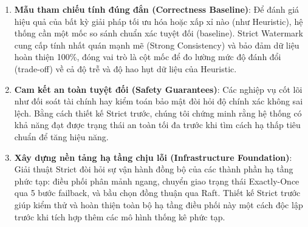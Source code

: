 \documentclass[12pt,a4paper]{article}
\begin{document}
\begin{enumerate}
    \item \textbf{Mẫu tham chiếu tính đúng đắn (Correctness Baseline)}: Để đánh giá hiệu quả của bất kỳ giải pháp tối ưu hóa hoặc xấp xỉ nào (như Heuristic), hệ thống cần một mốc so sánh chuẩn xác tuyệt đối (baseline). Strict Watermark cung cấp tính nhất quán mạnh mẽ (Strong Consistency) và bảo đảm dữ liệu hoàn thiện 100\%, đóng vai trò là cột mốc để đo lường mức độ đánh đổi (trade-off) về cả độ trễ và độ hao hụt dữ liệu của Heuristic.
    \item \textbf{Cam kết an toàn tuyệt đối (Safety Guarantees)}: Các nghiệp vụ cốt lõi như đối soát tài chính hay kiểm toán bảo mật đòi hỏi độ chính xác không sai lệch. Bằng cách thiết kế Strict trước, chúng tôi chứng minh rằng hệ thống có khả năng đạt được trạng thái an toàn tối đa trước khi tìm cách hạ thấp tiêu chuẩn để tăng hiệu năng.
    \item \textbf{Xây dựng nền tảng hạ tầng chịu lỗi (Infrastructure Foundation)}: Giải thuật Strict đòi hỏi sự vận hành đồng bộ của các thành phần hạ tầng phức tạp: điều phối phân mảnh ngang, chuyển giao trạng thái Exactly-Once qua 5 bước failback, và bầu chọn đồng thuận qua Raft. Thiết kế Strict trước giúp kiểm thử và hoàn thiện toàn bộ hạ tầng điều phối này một cách độc lập trước khi tích hợp thêm các mô hình thống kê phức tạp.
\end{enumerate}
\end{document}
